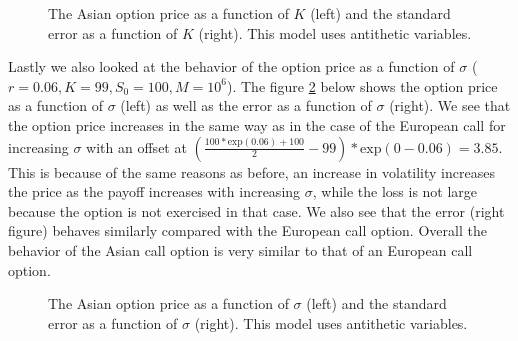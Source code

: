 \documentclass[11pt,a4paper]{article}
\begin{document}
\begin{figure}[H]
  \centering
  \caption{The Asian option price as a function of $K$ (left) and the standard error as a function of $K$ (right). This model uses antithetic variables.}
  \label{fig:asianstrike}
\end{figure}

Lastly we also looked at the behavior of the option price as a function of $\sigma$ ($r = 0.06, K = 99, S_0 = 100, M = 10^6$). The figure \ref{fig:asianvol} below shows the option price as a function of $\sigma$ (left) as well as the error as a function of $\sigma$ (right). We see that the option price increases in the same way as in the case of the European call for increasing $\sigma$ with an offset at $\left(\frac{100*\text{exp}(0.06)+100}{2} - 99\right)*\text{exp}(0-0.06) = 3.85$. This is because of the same reasons as before, an increase in volatility increases the price as the payoff increases with increasing $\sigma$, while the loss is not large because the option is not exercised in that case. We also see that the error (right figure) behaves similarly compared with the European call option. Overall the behavior of the Asian call option is very similar to that of an European call option.

\begin{figure}[H]
  \centering
  \caption{The Asian option price as a function of $\sigma$ (left) and the standard error as a function of $\sigma$ (right). This model uses antithetic variables.}
  \label{fig:asianvol}
\end{figure}
\end{document}
